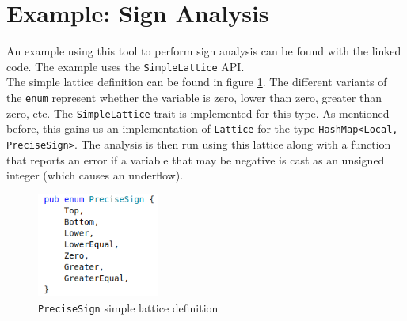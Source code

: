 \documentclass[11pt,a4paper]{article}
\begin{document}
\section{Example: Sign Analysis}

An example using this tool to perform sign analysis can be found with the
linked code. The example uses the \texttt{SimpleLattice} API.\\

The simple lattice definition can be found in figure \ref{fig:sign_lattice}. The different
variants of the \texttt{enum} represent whether the variable is zero, lower than zero, greater than zero, etc.
The \texttt{SimpleLattice} trait is implemented for this type.
As mentioned before, this gains us an implementation of \texttt{Lattice}
for the type \texttt{HashMap<Local, PreciseSign>}. The analysis is then run
using this lattice along with a function that reports an error if a variable
that may be negative is cast as an unsigned integer (which causes an underflow).\\

\begin{figure}
    \includegraphics[width=4cm]{img/precise_sign_analysis.png}
    \caption{\texttt{PreciseSign} simple lattice definition}
    \label{fig:sign_lattice}
\end{figure}
\end{document}
